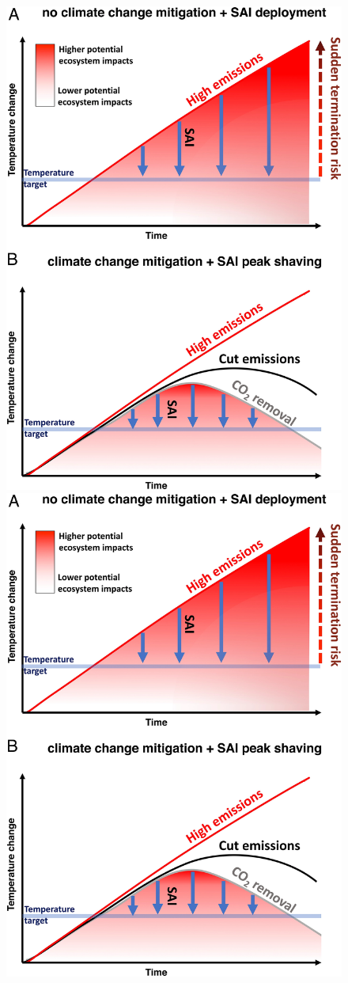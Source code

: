 \begin{figure}
	\begin{center}
		\includegraphics[trim=0cm 52.0cm 0cm 0cm,clip=true,width=0.48\columnwidth]{figures/pnas_fig2.png} \hfill
		\includegraphics[trim=0cm 0cm 0cm 51.89cm,clip=true,width=0.48\columnwidth]{figures/pnas_fig2.png}
	\end{center}

\end{figure}

